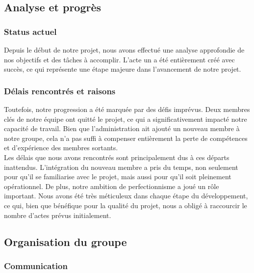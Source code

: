 

\subsection{Analyse et progrès}

\subsubsection{Status actuel}

Depuis le début de notre projet, nous avons effectué une analyse approfondie de nos objectifs et des tâches à accomplir. 
L'acte un a été entièrement créé avec succès, ce qui représente une étape majeure dans l'avancement de notre projet.

\subsubsection{Délais rencontrés et raisons}

Toutefois, notre progression a été marquée par des défis imprévus. 
Deux membres clés de notre équipe ont quitté le projet, ce qui a significativement impacté notre capacité de travail. 
Bien que l'administration ait ajouté un nouveau membre à notre groupe, cela n'a pas suffi à compenser entièrement la perte de compétences et d'expérience des membres sortants.
\\


Les délais que nous avons rencontrés sont principalement dus à ces départs inattendus. 
L'intégration du nouveau membre a pris du temps, non seulement pour qu'il se familiarise avec le projet, mais aussi pour qu'il soit pleinement opérationnel. De plus, notre ambition de perfectionnisme a joué un rôle important. 
Nous avons été très méticuleux dans chaque étape du développement, ce qui, bien que bénéfique pour la qualité du projet, nous a obligé à raccourcir le nombre d'actes prévus initialement.
\subsection{Organisation du groupe}

\subsubsection{Communication}

